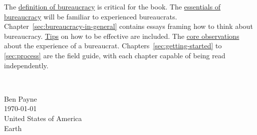 
The \hyperref[sec:define-bureaucracy]{definition of bureaucracy}
is critical for the book.
The \hyperref[sec:fundamentals-of-b]{essentials of bureaucracy} 
will be familiar to experienced bureaucrats. 
Chapter~\ref{sec:bureaucracy-in-general} contains  essays framing how to think about bureaucracy. 
\hyperref[sec:effective-bureaucrat]{Tips} on how to be effective are included. 
The \hyperref[sec:dilemma-trilemma]{core observations} about the experience of a bureaucrat.
Chapters~\ref{sec:getting-started} to \ref{sec:process} are the field guide, with each chapter capable of being read independently. %

\ \\

\begin{flushright}
Ben Payne\\
\today\\
United States of America\\
Earth
\end{flushright}


